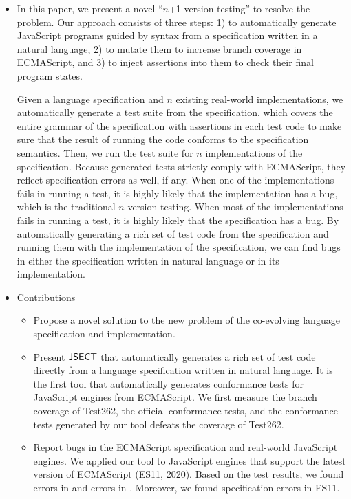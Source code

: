 \begin{itemize}
\item In this paper, we present a novel ``$n$+1-version testing'' to
resolve the problem. Our approach consists of three
steps: 1) to automatically generate JavaScript programs guided by
syntax from a specification written in a natural language, 2)
to mutate them to increase branch coverage in ECMAScript, and 3) to inject
assertions into them to check their final program states.

Given a language specification and $n$ existing
real-world implementations, we automatically generate a test suite from
the specification, which covers the entire grammar of the
specification with assertions in each test code to make sure that the
result of running the code conforms to the specification semantics.
Then, we run the test suite for $n$ implementations of the
specification. Because generated tests strictly comply with ECMAScript,
they reflect specification errors as well, if any.
 When one of the implementations fails in running a test,
it is highly likely that the implementation has a bug, which is the
traditional $n$-version testing. When most of the implementations fails
in running a test, it is highly likely that the specification has a
bug. By automatically generating a rich set of test code from the
specification and running them with the implementation of the
specification, we can find bugs in either the specification written in
natural language or in its implementation.

\item Contributions
\begin{itemize}
\item Propose a novel solution to the new problem of the co-evolving
  language specification and implementation.
\item Present $\text{\sf JSECT}$ that automatically generates a rich set of test
code directly from a language specification written in natural language.
It is the first tool that automatically
generates conformance tests for JavaScript engines from ECMAScript.
We first measure the branch coverage of Test262, the official
        conformance tests, and the conformance tests generated by our tool
        defeats the coverage of Test262.
\item Report bugs in the ECMAScript specification and real-world
JavaScript engines.
We applied our tool to  JavaScript engines that support the
        latest version of ECMAScript (ES11, 2020).  Based on the test results,
        we found  errors in  and  errors in
        . Moreover, we found  specification errors in
        ES11.
\end{itemize}


\end{itemize}
